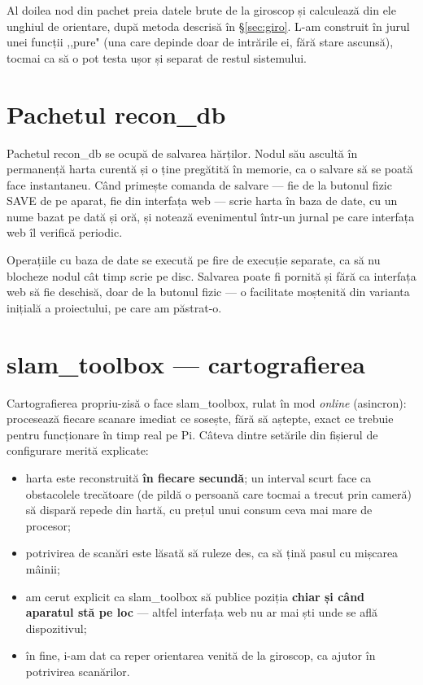 \documentclass[a4paper,12pt,twoside,openany]{report}
\renewcommand{\texttt}[1]{\textnormal{#1}}
\begin{document}
Al doilea nod din pachet preia datele brute de la giroscop și calculează din
ele unghiul de orientare, după metoda descrisă în §\ref{sec:giro}. L-am
construit în jurul unei funcții ,,pure" (una care depinde doar de intrările ei,
fără stare ascunsă), tocmai ca să o pot testa ușor și separat de restul
sistemului.

\section{Pachetul recon\_db}
\label{sec:recon-db}

Pachetul \texttt{recon\_db} se ocupă de salvarea hărților. Nodul său ascultă
în permanență harta curentă și o ține pregătită în memorie, ca o salvare să se
poată face instantaneu. Când primește comanda de salvare — fie de la butonul
fizic SAVE de pe aparat, fie din interfața web — scrie harta în baza de date,
cu un nume bazat pe dată și oră, și notează evenimentul într-un jurnal pe care
interfața web îl verifică periodic.

Operațiile cu baza de date se execută pe fire de execuție separate, ca să nu
blocheze nodul cât timp scrie pe disc. Salvarea poate fi pornită și fără ca
interfața web să fie deschisă, doar de la butonul fizic — o facilitate
moștenită din varianta inițială a proiectului, pe care am păstrat-o.

\section{slam\_toolbox — cartografierea}
\label{sec:slam-tb}

Cartografierea propriu-zisă o face slam\_toolbox, rulat în mod \textit{online}
(asincron): procesează fiecare scanare imediat ce sosește, fără să aștepte,
exact ce trebuie pentru funcționare în timp real pe Pi. Câteva dintre setările
din fișierul de configurare merită explicate:

\begin{itemize}\itemsep0pt
    \item harta este reconstruită \textbf{în fiecare secundă}; un interval
          scurt face ca obstacolele trecătoare (de pildă o persoană care
          tocmai a trecut prin cameră) să dispară repede din hartă, cu prețul
          unui consum ceva mai mare de procesor;
    \item potrivirea de scanări este lăsată să ruleze des, ca să țină pasul cu
          mișcarea mâinii;
    \item am cerut explicit ca slam\_toolbox să publice poziția \textbf{chiar
          și când aparatul stă pe loc} — altfel interfața web nu ar mai ști
          unde se află dispozitivul;
    \item în fine, i-am dat ca reper orientarea venită de la giroscop, ca
          ajutor în potrivirea scanărilor.
\end{itemize}
\end{document}

